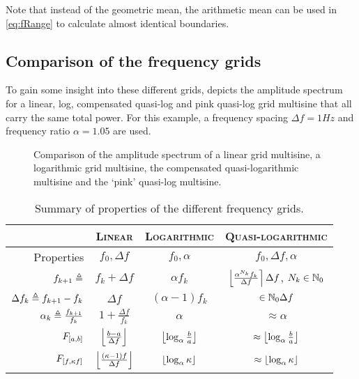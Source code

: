   Note that instead of the geometric mean, the arithmetic mean can be used in \eqref{eq:fRange} to calculate almost identical boundaries.

  \subsection{Comparison of the frequency grids}
  To gain some insight into these different grids,  depicts the amplitude spectrum for a linear, log, compensated quasi-log and pink quasi-log grid multisine that all carry the same total power.
  For this example, a frequency spacing $\Delta f = 1\unit{Hz}$ and frequency ratio $\alpha = 1.05$ are used.
  
  \begin{figure}[ht]
    \centering
    \setlength\figureheight{5cm}
    \setlength{}
    
    \caption[Amplitude spectrum for linear, logarithmic, quasi-logarithmic grids.]{Comparison of the amplitude spectrum of a linear grid multisine, a logarithmic grid multisine, the compensated quasi-logarithmic multisine and the `pink' quasi-log multisine.}%
    \label{fig:freqGrids}
  \end{figure}

  \begin{table}
  \centering
   \caption{Summary of  properties of the different frequency grids.}
    \begin{tabular}{rccc} 
    \toprule
     & \textsc{Linear} & \textsc{Logarithmic} & \textsc{Quasi-logarithmic} \\
    \midrule
    Properties 
       & $f_0, \Delta f$ 
       & $f_0, \alpha$ 
       & $f_0, \Delta f, \alpha$\\
    \midrule
    $f_{k+1} \triangleq$ 
       & $f_{k} + \Delta f$ 
       & $\alpha f_{k}$
       & $\left\lfloor \frac{\alpha^{N_k} f_k}{\Delta f} \right\rceil \Delta f$,   $N_k \in \mathbb{N}_{0}$
       \\[5pt]
    $\Delta f_k \triangleq f_{k+1} - f_k$ 
       & $\Delta f$
       & $(\alpha - 1) f_k$
       & $ \in \mathbb{N}_{0} \Delta f$ \\[5pt]
    $\alpha_k \triangleq \frac{f_{k+1}}{f_k}$ 
       & $1 + \frac{\Delta f}{f_k}$ 
       & $\alpha$ 
       & $\approx \alpha $ \\[5pt]
    $F_{\left[ a,b \right]}$
       & $\left\lfloor \frac{b - a}{\Delta f} \right\rfloor$
       & $\left\lfloor \log_{\alpha} \frac{b}{a} \right\rfloor$
       & $\approx \left\lfloor \log_{\alpha} \frac{b}{a} \right\rfloor$\\[5pt]
    $F_{\left[ f, \kappa f \right]}$
      & $\left\lfloor \frac{(\kappa - 1)f}{\Delta f} \right\rfloor$
      & $\left\lfloor \log_{\alpha} \kappa \right\rfloor$
      & $\approx \left\lfloor \log_{\alpha} \kappa \right\rfloor$\\[5pt]
    \bottomrule
    \end{tabular}
  \end{table}

